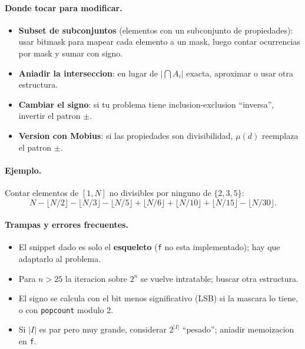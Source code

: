 \paragraph{Donde tocar para modificar.}
\begin{itemize}\setlength\itemsep{0pt}
	\item \textbf{Subset de subconjuntos} (elementos con un subconjunto de propiedades): usar bitmask para mapear cada elemento a un mask, luego contar ocurrencias por mask y sumar con signo.
	\item \textbf{Aniadir la interseccion}: en lugar de $|\bigcap A_i|$ exacta, aproximar o usar otra estructura.
	\item \textbf{Cambiar el signo}: si tu problema tiene inclusion-exclusion ``inversa'', invertir el patron $\pm$.
	\item \textbf{Version con Mobius}: si las propiedades son divisibilidad, $\mu(d)$ reemplaza el patron $\pm$.
\end{itemize}

\paragraph{Ejemplo.}
Contar elementos de $[1, N]$ no divisibles por ninguno de $\{2, 3, 5\}$:
\[ N - \lfloor N/2 \rfloor - \lfloor N/3 \rfloor - \lfloor N/5 \rfloor + \lfloor N/6 \rfloor + \lfloor N/10 \rfloor + \lfloor N/15 \rfloor - \lfloor N/30 \rfloor. \]

\paragraph{Trampas y errores frecuentes.}
\begin{itemize}\setlength\itemsep{0pt}
	\item El snippet dado es solo el \textbf{esqueleto} (\texttt{f} no esta implementado); hay que adaptarlo al problema.
	\item Para $n > 25$ la iteracion sobre $2^n$ se vuelve intratable; buscar otra estructura.
	\item El signo se calcula con el bit menos significativo (LSB) si la mascara lo tiene, o con \texttt{popcount} modulo 2.
	\item Si $|I|$ es par pero muy grande, considerar $2^{|I|}$ ``pesado''; aniadir memoizacion en \texttt{f}.
\end{itemize}

